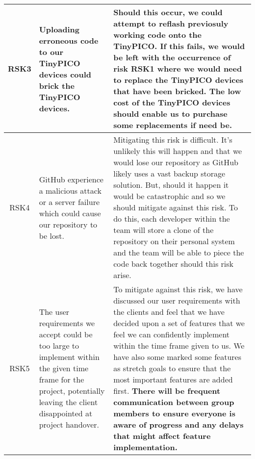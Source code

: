 \begin{xltabular}[H]{\textwidth}{c | X | X}
    RSK3

    &

    Uploading erroneous code to our TinyPICO devices could brick the TinyPICO devices.

    &

    Should this occur, we could attempt to reflash previosuly working code onto the TinyPICO. If this fails, we would be left with the occurrence of risk RSK1 where we would need to replace the TinyPICO devices that have been bricked. The low cost of the TinyPICO devices should enable us to purchase some replacements if need be.\\

    \midrule

    RSK4

    &

    GitHub experience a malicious attack or a server failure which could cause our repository to be lost.

    &

    Mitigating this risk is difficult. It's unlikely this will happen and that we would lose our repository as GitHub likely uses a vast backup storage solution. But, should it happen it would be catastrophic and so we should mitigate against this risk. To do this, each developer within the team will store a clone of the repository on their personal system and the team will be able to piece the code back together should this risk arise.\\

    \midrule

    RSK5

    &

    The user requirements we accept could be too large to implement within the given time frame for the project, potentially leaving the client disappointed at project handover.

    &

    To mitigate against this risk, we have discussed our user requirements with the clients and feel that we have decided upon a set of features that we feel we can confidently implement within the time frame given to us. We have also some marked some features as stretch goals to ensure that the most important features are added first. \textbf{There will be frequent communication between group members to ensure everyone is aware of progress and any delays that might affect feature implementation.}\\

    \midrule


\end{xltabular}
